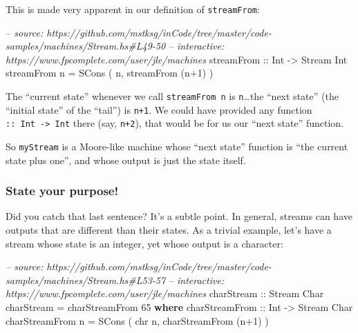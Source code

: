\documentclass[]{article}
\newenvironment{Shaded}{}{}
\newcommand{\KeywordTok}[1]{\textcolor[rgb]{0.00,0.44,0.13}{\textbf{{#1}}}}
\newcommand{\DataTypeTok}[1]{\textcolor[rgb]{0.56,0.13,0.00}{{#1}}}
\newcommand{\DecValTok}[1]{\textcolor[rgb]{0.25,0.63,0.44}{{#1}}}
\newcommand{\CommentTok}[1]{\textcolor[rgb]{0.38,0.63,0.69}{\textit{{#1}}}}
\newcommand{\OtherTok}[1]{\textcolor[rgb]{0.00,0.44,0.13}{{#1}}}
\newcommand{\FunctionTok}[1]{\textcolor[rgb]{0.02,0.16,0.49}{{#1}}}
\newcommand{\NormalTok}[1]{{#1}}
\begin{document}
This is made very apparent in our definition of \texttt{streamFrom}:

\begin{Shaded}
\begin{Highlighting}[]
\CommentTok{-- source: https://github.com/mstksg/inCode/tree/master/code-samples/machines/Stream.hs#L49-50}
\CommentTok{-- interactive: https://www.fpcomplete.com/user/jle/machines}
\OtherTok{    streamFrom ::} \DataTypeTok{Int} \OtherTok{->} \DataTypeTok{Stream} \DataTypeTok{Int}
    \NormalTok{streamFrom n }\FunctionTok{=} \DataTypeTok{SCons} \NormalTok{( n, streamFrom (n}\FunctionTok{+}\DecValTok{1}\NormalTok{) )}
\end{Highlighting}
\end{Shaded}

The ``current state'' whenever we call \texttt{streamFrom\ n} is
\texttt{n}\ldots{}the ``next state'' (the ``initial state'' of the ``tail'') is
\texttt{n+1}. We could have provided any function
\texttt{::\ Int\ -\textgreater{}\ Int} there (say, \texttt{n+2}), that would be
for us our ``next state'' function.

So \texttt{myStream} is a Moore-like machine whose ``next state'' function is
``the current state plus one'', and whose output is just the state itself.

\subsubsection{State your purpose!}\label{state-your-purpose}

Did you catch that last sentence? It's a subtle point. In general, streams can
have outputs that are different than their states. As a trivial example, let's
have a stream whose state is an integer, yet whose output is a character:

\begin{Shaded}
\begin{Highlighting}[]
\CommentTok{-- source: https://github.com/mstksg/inCode/tree/master/code-samples/machines/Stream.hs#L53-57}
\CommentTok{-- interactive: https://www.fpcomplete.com/user/jle/machines}
\OtherTok{charStream ::} \DataTypeTok{Stream} \DataTypeTok{Char}
\NormalTok{charStream }\FunctionTok{=} \NormalTok{charStreamFrom }\DecValTok{65}
  \KeywordTok{where}
\OtherTok{    charStreamFrom ::} \DataTypeTok{Int} \OtherTok{->} \DataTypeTok{Stream} \DataTypeTok{Char}
    \NormalTok{charStreamFrom n }\FunctionTok{=} \DataTypeTok{SCons} \NormalTok{( chr n, charStreamFrom (n}\FunctionTok{+}\DecValTok{1}\NormalTok{) )}
\end{Highlighting}
\end{Shaded}
\end{document}
